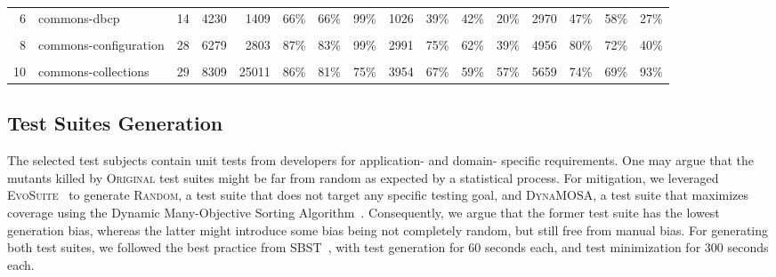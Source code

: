 \documentclass[sigconf]{acmart}
\newcommand{\Evosuite}{\textsc{EvoSuite}\xspace}
\newcommand{\original}{\textsc{Original}\xspace}
\newcommand{\EvosuiteRandom}{\textsc{Random}\xspace}
\newcommand{\EvosuiteDynamosa}{\textsc{DynaMOSA}\xspace}
\begin{document}
\begin{table}
\begin{tabular}{|r| l | r | r | r|r|r|r | r|r|r|r | r|r|r|r |}
6 & commons-dbcp            & 14	  & 4230	& 1409	& 66\% & 66\% & 99\%  & 1026	& 39\% & 42\% & 20\% & 2970	  & 47\% & 58\% & 27\% \\
\cellcolor[HTML]{FFFF00}{7} & \cellcolor[HTML]{FFFF00}{commons-csv}             & \cellcolor[HTML]{FFFF00}{2}	    & \cellcolor[HTML]{FFFF00}{635}		& \cellcolor[HTML]{FFFF00}{312}		& \cellcolor[HTML]{FFFF00}{89\%} & \cellcolor[HTML]{FFFF00}{85\%} & \cellcolor[HTML]{FFFF00}{81\%}  & \cellcolor[HTML]{FFFF00}{365}		& \cellcolor[HTML]{FFFF00}{78\%} & \cellcolor[HTML]{FFFF00}{63\%} & \cellcolor[HTML]{FFFF00}{60\%} & \cellcolor[HTML]{FFFF00}{647}		& \cellcolor[HTML]{FFFF00}{89\%} & \cellcolor[HTML]{FFFF00}{83\%} & \cellcolor[HTML]{FFFF00}{76\%} \\
8 & commons-configuration   & 28		& 6279	& 2803	& 87\% & 83\% & 99\%  & 2991	& 75\% & 62\% & 39\% & 4956	  & 80\% & 72\% & 40\% \\
\cellcolor[HTML]{FFFF00}{9} & \cellcolor[HTML]{FFFF00}{commons-compress}        & \cellcolor[HTML]{FFFF00}{24}  	& \cellcolor[HTML]{FFFF00}{9566}	& \cellcolor[HTML]{FFFF00}{1047}	& \cellcolor[HTML]{FFFF00}{84\%} & \cellcolor[HTML]{FFFF00}{76\%} & \cellcolor[HTML]{FFFF00}{65\%}  & \cellcolor[HTML]{FFFF00}{2610} 	& \cellcolor[HTML]{FFFF00}{63\%} & \cellcolor[HTML]{FFFF00}{45\%} & \cellcolor[HTML]{FFFF00}{44\%} & \cellcolor[HTML]{FFFF00}{4306}	  & \cellcolor[HTML]{FFFF00}{70\%} & \cellcolor[HTML]{FFFF00}{57\%} & \cellcolor[HTML]{FFFF00}{49\%} \\
10 & commons-collections    & 29  	& 8309 	& 25011 & 86\% & 81\% & 75\%  & 3954 	&	67\% & 59\% & 57\% & 5659	  &	74\% & 69\% & 93\% \\
    \hline
\end{tabular}
\label{tbl:subjectmeasures}
\end{table}

\subsection{Test Suites Generation}
\label{sec:testgeneration}
The selected test subjects contain unit tests
from developers %
for application- and
domain- specific requirements.
One may argue that the mutants killed by
\original test suites might be far from random as expected by a statistical process.
For mitigation,
we leveraged \Evosuite~\cite{fraser2011evosuite}
to generate \EvosuiteRandom, a test suite that does not target any specific testing goal,
and \EvosuiteDynamosa, a test suite that maximizes coverage using the Dynamic Many-Objective Sorting Algorithm~\cite{panichella2015reformulating}.
Consequently, we argue that the former test suite has the lowest generation bias, whereas
the latter might introduce some bias being not completely random, but still free from manual bias.
For generating both test suites, we followed the best practice from
SBST~\cite{devroey2020java,panichella2021sbst,DBLP:conf/sbst/GambiJRZ22},
with test generation for 60 seconds each, and test minimization for 300 seconds each.
\end{document}
